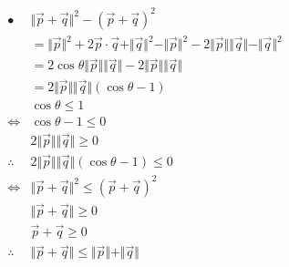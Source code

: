 \documentclass[12pt]{article}
\begin{document}
\begin{align*}
•
    &\Vert \vec{p} + \vec{q} \Vert^2 - (\vec{p} + \vec{q})^2 \\
    &= \Vert \vec{p} \Vert^2 
     + 2 \vec{p} \cdot \vec{q} 
     + \Vert \vec{q} \Vert^2 
     - \Vert \vec{p} \Vert^2 
     - 2 \Vert \vec{p} \Vert \Vert \vec{q} \Vert 
     - \Vert \vec{q} \Vert^2 \\
    &= 2 \cos{\theta} \Vert \vec{p} \Vert \Vert \vec{q} \Vert 
     - 2 \Vert \vec{p} \Vert \Vert \vec{q} \Vert \\
    &= 2 \Vert \vec{p} \Vert \Vert \vec{q} \Vert (\cos{\theta} - 1) \\
    &\cos{\theta} \leq 1 \\
    \Leftrightarrow &\cos{\theta} - 1 \leq 0 \\
    &2 \Vert \vec{p} \Vert \Vert \vec{q} \Vert \geq 0 \\
    \therefore &2 \Vert \vec{p} \Vert \Vert \vec{q} \Vert (\cos{\theta} - 1) \leq 0 \\
    \Leftrightarrow &\Vert \vec{p} + \vec{q} \Vert^2 \leq (\vec{p} + \vec{q})^2 \\
    &\Vert \vec{p} + \vec{q} \Vert \geq 0 \\
    &\vec{p} + \vec{q} \geq 0\\
    \therefore & \Vert \vec{p} + \vec{q} \Vert \leq \Vert \vec{p} \Vert + \Vert \vec{q} \Vert
\end{align*}
\end{document}
